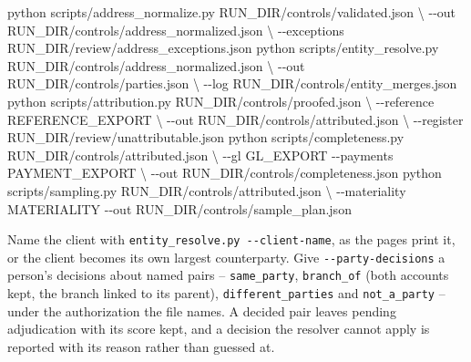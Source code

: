 \documentclass[
]{article}
\newenvironment{Shaded}{}{}
\newcommand{\AttributeTok}[1]{\textcolor[rgb]{0.49,0.56,0.16}{#1}}
\newcommand{\DataTypeTok}[1]{\textcolor[rgb]{0.56,0.13,0.00}{#1}}
\newcommand{\ExtensionTok}[1]{#1}
\newcommand{\NormalTok}[1]{#1}
\begin{document}
\begin{Shaded}
\begin{Highlighting}[]
\ExtensionTok{python}\NormalTok{ scripts/address\_normalize.py RUN\_DIR/controls/validated.json }\DataTypeTok{\textbackslash{}}
  \AttributeTok{{-}{-}out}\NormalTok{ RUN\_DIR/controls/address\_normalized.json }\DataTypeTok{\textbackslash{}}
  \AttributeTok{{-}{-}exceptions}\NormalTok{ RUN\_DIR/review/address\_exceptions.json}
\ExtensionTok{python}\NormalTok{ scripts/entity\_resolve.py RUN\_DIR/controls/address\_normalized.json }\DataTypeTok{\textbackslash{}}
  \AttributeTok{{-}{-}out}\NormalTok{ RUN\_DIR/controls/parties.json }\DataTypeTok{\textbackslash{}}
  \AttributeTok{{-}{-}log}\NormalTok{ RUN\_DIR/controls/entity\_merges.json}
\ExtensionTok{python}\NormalTok{ scripts/attribution.py RUN\_DIR/controls/proofed.json }\DataTypeTok{\textbackslash{}}
  \AttributeTok{{-}{-}reference}\NormalTok{ REFERENCE\_EXPORT }\DataTypeTok{\textbackslash{}}
  \AttributeTok{{-}{-}out}\NormalTok{ RUN\_DIR/controls/attributed.json }\DataTypeTok{\textbackslash{}}
  \AttributeTok{{-}{-}register}\NormalTok{ RUN\_DIR/review/unattributable.json}
\ExtensionTok{python}\NormalTok{ scripts/completeness.py RUN\_DIR/controls/attributed.json }\DataTypeTok{\textbackslash{}}
  \AttributeTok{{-}{-}gl}\NormalTok{ GL\_EXPORT }\AttributeTok{{-}{-}payments}\NormalTok{ PAYMENT\_EXPORT }\DataTypeTok{\textbackslash{}}
  \AttributeTok{{-}{-}out}\NormalTok{ RUN\_DIR/controls/completeness.json}
\ExtensionTok{python}\NormalTok{ scripts/sampling.py RUN\_DIR/controls/attributed.json }\DataTypeTok{\textbackslash{}}
  \AttributeTok{{-}{-}materiality}\NormalTok{ MATERIALITY }\AttributeTok{{-}{-}out}\NormalTok{ RUN\_DIR/controls/sample\_plan.json}
\end{Highlighting}
\end{Shaded}

Name the client with
\texttt{entity\_\allowbreak{}resolve.py -\allowbreak{}-\allowbreak{}client-\allowbreak{}name},
as the pages print it, or the client becomes its own largest
counterparty. Give \texttt{-\/-party-decisions} a person's decisions
about named pairs -- \texttt{same\_\allowbreak{}party},
\texttt{branch\_\allowbreak{}of} (both accounts kept, the branch linked
to its parent), \texttt{different\_\allowbreak{}parties} and
\texttt{not\_\allowbreak{}a\_\allowbreak{}party} -- under the
authorization the file names. A decided pair leaves pending adjudication
with its score kept, and a decision the resolver cannot apply is
reported with its reason rather than guessed at.
\end{document}
